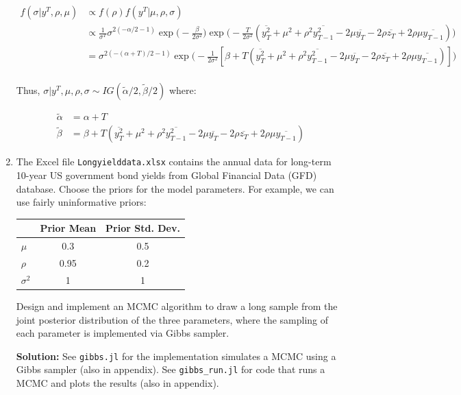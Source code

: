 \documentclass{article}
\begin{document}
\begin{enumerate}
\begin{align*}
f(\sigma|y^T, \rho, \mu) 
&\propto f(\rho) f(y^T|\mu, \rho, \sigma)\\
&\propto \frac{1}{\sigma^T} \sigma^{2(-\alpha/2 - 1)} \exp \Bigg( - \frac{\beta}{2\sigma^2}\Bigg) \exp \Bigg( - \frac{T}{2 \sigma^2} (\overline{y_T^2} + \mu^2 +  \rho^2 \overline{y_{T-1}^2} - 2\mu \overline{ y_T } - 2 \rho \overline{ z_T} + 2\rho \mu \overline{y_{T-1}})\Bigg)\\
&= \sigma^{2(-(\alpha+T)/2 - 1)} \exp \Bigg( - \frac{1}{2\sigma^2} [\beta + T (\overline{y_T^2} + \mu^2 +  \rho^2 \overline{y_{T-1}^2} - 2\mu \overline{ y_T } - 2 \rho \overline{ z_T} + 2\rho \mu \overline{y_{T-1}})]\Bigg)\\
\end{align*}

\pagebreak

Thus, $\sigma | y^T, \mu, \rho, \sigma \sim IG(\tilde{\alpha}/2, \tilde{\beta}/2)$ where:

\begin{align*}
\tilde{\alpha} &= \alpha + T\\
\tilde{\beta} &= \beta + T (\overline{y_T^2} + \mu^2 +  \rho^2 \overline{y_{T-1}^2} - 2\mu \overline{ y_T } - 2 \rho \overline{ z_T} + 2\rho \mu \overline{y_{T-1}})
\end{align*}


\item The Excel file \texttt{Longyielddata.xlsx} contains the annual data for long-term 10-year US
government bond yields from Global Financial Data (GFD) database. Choose the priors for the model parameters. For example, we can use fairly uninformative
priors:

\begin{center}
\begin{tabular}{ l | c c }
& Prior Mean & Prior Std. Dev. \\ 
\hline
 $\mu$  & 0.3 & 0.5  \\  
 $\rho$ & 0.95 & 0.2 \\
 $\sigma^2$ & 1 & 1
\end{tabular}
\end{center}

Design and implement an MCMC algorithm to draw a long sample from the joint posterior
distribution of the three parameters, where the sampling of each parameter is implemented
via Gibbs sampler.

\textbf{Solution:} See \texttt{gibbs.jl} for the implementation simulates a MCMC using a Gibbs sampler (also in appendix). See \texttt{gibbs\_run.jl} for code that runs a MCMC and plots the results (also in appendix). 


\end{enumerate}
\end{document}
